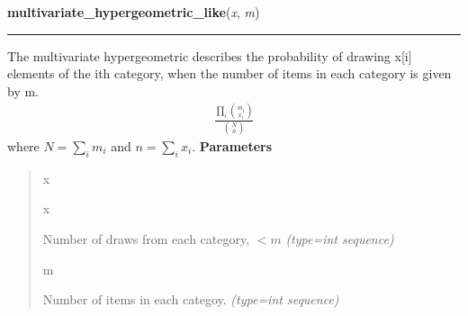     \label{pymc:distributions:multivariate_hypergeometric_like}

    \vspace{0.5ex}

\hspace{.8\funcindent}\begin{boxedminipage}{\funcwidth}

    \raggedright \textbf{multivariate\_hypergeometric\_like}(\textit{x}, \textit{m})

    \vspace{-1.5ex}

    \rule{\textwidth}{0.5\fboxrule}
\setlength{\parskip}{2ex}

The multivariate hypergeometric describes the probability of drawing x{[}i{]}
elements of the ith category, when the number of items in each category is
given by m.
\begin{equation*}\begin{split}\frac{\prod_i \binom{m_i}{x_i}}{\binom{N}{n}}\end{split}\end{equation*}
where $N = \sum_i m_i$ and $n = \sum_i x_i$.
\setlength{\parskip}{1ex}
      \textbf{Parameters}
      \vspace{-1ex}

      \begin{quote}
        \begin{Ventry}{x}

          \item[x]


Number of draws from each category, $< m$
            {\it (type=int sequence)}

          \item[m]


Number of items in each categoy.
            {\it (type=int sequence)}

        \end{Ventry}

      \end{quote}

    \end{boxedminipage}

    \label{pymc:distributions:mv_normal_chol_like}

    \vspace{0.5ex}


